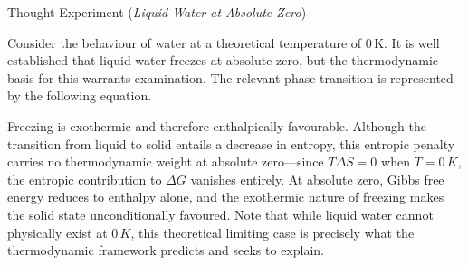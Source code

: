 \documentclass[10pt]{article}
\begin{document}
    \begin{core}{Thought Experiment (\textit{Liquid Water at Absolute Zero})}

      Consider the behaviour of water at a theoretical temperature of $0\,\text{K}$. It is well established that liquid water freezes at absolute zero, but the thermodynamic basis for this warrants examination. The relevant phase transition is represented by the following equation.


      Freezing is exothermic and therefore enthalpically favourable. Although the transition from liquid to solid entails a decrease in entropy, this entropic penalty carries no thermodynamic weight at absolute zero---since $T\Delta S = 0$ when $T = 0\,K$, the entropic contribution to $\Delta G$ vanishes entirely. At absolute zero, Gibbs free energy reduces to enthalpy alone, and the exothermic nature of freezing makes the solid state unconditionally favoured. Note that while liquid water cannot physically exist at $0\,K$, this theoretical limiting case is precisely what the thermodynamic framework predicts and seeks to explain.


\end{core}
\end{document}
